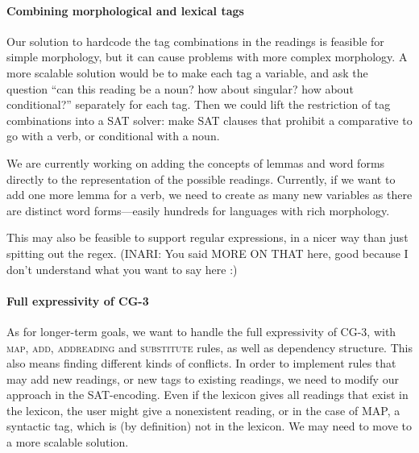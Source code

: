 \paragraph{Combining morphological and lexical tags}

Our solution to hardcode the tag combinations in the readings is
feasible for simple morphology, but it can cause problems with more
complex morphology.
A more scalable solution would be to make each tag a variable, and ask the
question ``can this reading be a noun? how about singular? how about
conditional?'' separately for each tag. Then we could lift the
restriction of tag combinations into a SAT solver: make SAT clauses
that prohibit a comparative to go with a verb, or conditional with a noun.

We are currently working on adding the concepts of lemmas and word
forms directly to the representation of the possible readings.
Currently, if we want to add one more lemma for a verb, we need to
create as many new variables as there are distinct word forms---easily
hundreds for languages with rich morphology. 

This may also be feasible to support regular expressions, in a nicer
way than just spitting out the regex. (INARI: You said MORE ON THAT here, good because I don't understand what you want to say here :)

\paragraph{Full expressivity of CG-3}
As for longer-term goals, we want to handle the full expressivity of CG-3,
with \textsc{map}, \textsc{add},  \textsc{addreading} and
\textsc{substitute} rules, as well as dependency structure. 
This also means finding different kinds of conflicts.
In order to implement rules that may add new readings, or new tags to
existing readings, we need to modify our approach in the SAT-encoding.
Even if the lexicon gives all readings that exist in the lexicon, the
user might give a nonexistent reading, or in the case of MAP, a
syntactic tag, which is (by definition) not in the lexicon. We may need to move
to a more scalable solution.




